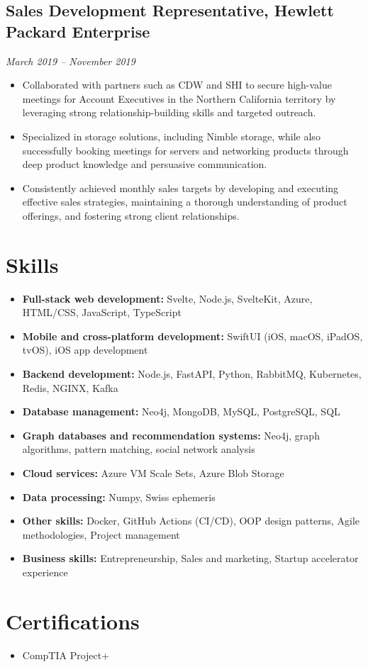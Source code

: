\documentclass[a4paper,10pt]{article}
\begin{document}
\subsection*{Sales Development Representative, Hewlett Packard Enterprise}
\textit{March 2019 -- November 2019}
\begin{itemize}
    \item Collaborated with partners such as CDW and SHI to secure high-value meetings for Account Executives in the Northern California territory by leveraging strong relationship-building skills and targeted outreach.
    \item Specialized in storage solutions, including Nimble storage, while also successfully booking meetings for servers and networking products through deep product knowledge and persuasive communication.
    \item Consistently achieved monthly sales targets by developing and executing effective sales strategies, maintaining a thorough understanding of product offerings, and fostering strong client relationships.
\end{itemize}

\section*{Skills}
\begin{itemize}[leftmargin=0in, label={}]
    \item \textbf{Full-stack web development:} Svelte, Node.js, SvelteKit, Azure, HTML/CSS, JavaScript, TypeScript
    \item \textbf{Mobile and cross-platform development:} SwiftUI (iOS, macOS, iPadOS, tvOS), iOS app development
    \item \textbf{Backend development:} Node.js, FastAPI, Python, RabbitMQ, Kubernetes, Redis, NGINX, Kafka
    \item \textbf{Database management:} Neo4j, MongoDB, MySQL, PostgreSQL, SQL
    \item \textbf{Graph databases and recommendation systems:} Neo4j, graph algorithms, pattern matching, social network analysis
    \item \textbf{Cloud services:} Azure VM Scale Sets, Azure Blob Storage
    \item \textbf{Data processing:} Numpy, Swiss ephemeris
    \item \textbf{Other skills:} Docker, GitHub Actions (CI/CD), OOP design patterns, Agile methodologies, Project management
    \item \textbf{Business skills:} Entrepreneurship, Sales and marketing, Startup accelerator experience
\end{itemize}

\section*{Certifications}
\begin{itemize}[leftmargin=0in, label={}]
    \item CompTIA Project+
\end{itemize}
\end{document}
